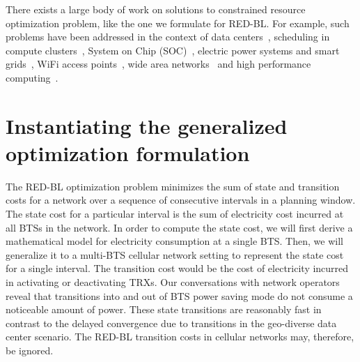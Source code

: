 There exists a large body of work on solutions to constrained resource optimization problem, like the one we formulate for RED-BL. For example, such problems have been addressed in the context of data centers~\cite{Jeyarani:2012:DIA:2148243.2148374,serverEnergy,Mazzucco:Maximizing:2011:CoRR,Oh:2011:ECS:2170444.2170458,Chase:2001:MES:502059.502045}, scheduling in compute clusters~\cite{AlDaoud2012745}, System on Chip (SOC)~\cite{Fang:2011:COP:1995896.1995940}, electric power systems and smart grids~\cite{Javed:2008:ULP:1485753.1485792,Logenthiran2011138,Celli:2001:PICA,FahadJavedAdOpt.SASO.2009.26}, WiFi access points~\cite{Marsan:2010:SAM:1791314.1791340}, wide area networks~\cite{Cavdar:2011:ECOC} and high performance computing~\cite{Lee:ServerConsolidation:2011:Globecom,Pinheiro01loadbalancing,Yao:DCPowerReduction:2012:INFOCOM,Herodotou:Starfish:2011:CIDR,Herodotou:2011:NOS:2038916.2038934,Aikema:ElecCostHPC:2011:ISSST}.




\section{Instantiating the generalized optimization formulation} %
\label{sec:case2:instantiate}
The RED-BL optimization problem minimizes the sum of state and transition costs for a network over a sequence of consecutive intervals in a planning window. The state cost for a particular interval is the sum of electricity cost incurred at all BTSs in the network. In order to compute the state cost, we will first derive a mathematical model for electricity consumption at a single BTS. Then, we will generalize it to a multi-BTS cellular network setting to represent the state cost for a single interval. The transition cost would be the cost of electricity incurred in activating or deactivating TRXs. Our conversations with network operators reveal that transitions into and out of BTS power saving mode do not consume a noticeable amount of power. These state transitions are reasonably fast in contrast to the delayed convergence due to transitions in the geo-diverse data center scenario. The RED-BL transition costs in cellular networks may, therefore, be ignored.

